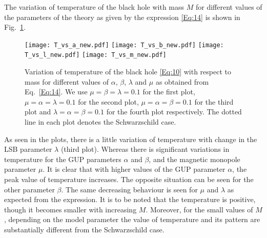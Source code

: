 \documentclass[aps,amsmath,amssymb,showpacs,showkeys]{revtex4}
\begin{document}
The variation of temperature of the black hole with mass $M$ for 
different values of the parameters of the theory as given by the expression
\eqref{Eq:14} is shown in Fig.~\ref{Fig01}.
\begin{figure}[h!]
\texttt{[image: T\_vs\_a\_new.pdf]}\hspace{0.5cm}
\texttt{[image: T\_vs\_b\_new.pdf]}\vspace{0.2cm}
\texttt{[image: T\_vs\_l\_new.pdf]}\hspace{0.5cm}
\texttt{[image: T\_vs\_m\_new.pdf]}
\vspace{-0.5mm}
\caption{ Variation of temperature of the black hole \eqref{Eq:10} with
respect to mass for different values of $\alpha$, $\beta$, $\lambda$ and 
$\mu$ as obtained from Eq.~\eqref{Eq:14}. We use $\mu =\beta =\lambda=0.1$ for 
the first plot, $\mu = \alpha = \lambda = 0.1$ for the second plot, 
$\mu=\alpha=\beta=0.1$ for the third plot and $\lambda=\alpha=\beta=0.1$ 
for the fourth plot respectively. The dotted line in each plot denotes the 
Schwarzschild case.}
\label{Fig01}
\end{figure}
 As seen in the plots, there is a little variation of temperature with 
change in the LSB parameter $\lambda$ (third plot). Whereas there is 
significant variations in temperature for the GUP parameters $\alpha$ and  
$\beta$, and the magnetic monopole parameter $\mu$. It is clear that with 
higher values of the GUP parameter $\alpha$, the peak value of temperature 
increases. The opposite situation can be seen for the other parameter $\beta$. 
The same decreasing behaviour is seen for $\mu$ and $\lambda$ as expected from
the expression. It is to be noted that the temperature is positive, though it 
becomes smaller with increasing $M$. Moreover, for the small values of $M$, 
depending on the model parameter the value of temperature and its pattern are 
substantially different from the Schwarzschild case.

\end{document}
